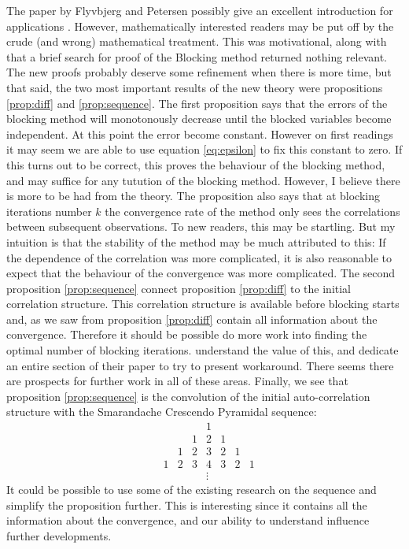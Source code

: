 \documentclass[11pt,english,a4paper]{article}
\begin{document}
The paper by Flyvbjerg and Petersen possibly give an excellent introduction for applications \parencite[461-466]{flyvbjerg_error_1989}. However, mathematically interested readers may be put off by the crude (and wrong) mathematical treatment. This was motivational, along with that a brief search for proof of the Blocking method returned nothing relevant. The new proofs probably deserve some refinement when there is more time, but that said, the two most important results of the new theory were propositions \ref{prop:diff} and \ref{prop:sequence}. The first proposition says that the errors of the blocking method will monotonously decrease until the blocked variables become independent. At this point the error become constant. However on first readings it may seem we are able to use equation \eqref{eq:epsilon} to fix this constant to zero. If this turns out to be correct, this proves the behaviour of the blocking method, and may suffice for any tutution of the blocking method. However, I believe there is more to be had from the theory. The proposition also says that at blocking iterations number $k$ the convergence rate of the method only sees the correlations between subsequent observations. To new readers, this may be startling. But my intuition is that the stability of the method may be much attributed to this: If the dependence of the correlation was more complicated, it is also reasonable to expect that the behaviour of the convergence was more complicated. The second proposition \ref{prop:sequence} connect proposition \ref{prop:diff} to the initial correlation structure. This correlation structure is available before blocking starts and, as we saw from proposition \ref{prop:diff} contain all information about the convergence. Therefore it should be possible do more work into finding the optimal number of blocking iterations. \cite{flyvbjerg_error_1989} understand the value of this, and dedicate an entire section of their paper to try to present workaround. There seems there are prospects for further work in all of these areas. Finally, we see that proposition \ref{prop:sequence} is the convolution of the initial auto-correlation structure with the Smarandache Crescendo Pyramidal sequence:
\[
\begin{matrix}
&&&&1&\\
&&&1&2&1\\
&&1&2&3&2&1\\
&1&2&3&4&3&2&1\\
&&&&\vdots
\end{matrix}
\]
It could be possible to use some of the existing research on the sequence and simplify the proposition further. This is interesting since it contains all the information about the convergence, and our ability to understand influence further developments.
\end{document}
